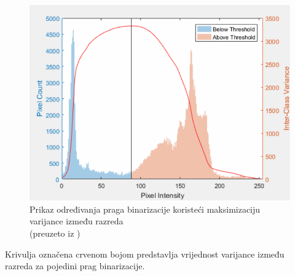 \documentclass[times, utf8, diplomski]{fer}
\theoremstyle{definition}
\begin{document}
\begin{figure}[h]
\centering
\includegraphics[scale=0.46]{otsu_method.png}
\caption{Prikaz određivanja praga binarizacije koristeći maksimizaciju varijance između razreda \\ (preuzeto iz \cite{ otsu:xxx})}
\end{figure}
Krivulja označena crvenom bojom predstavlja vrijednost varijance između razreda za pojedini prag binarizacije.
\end{document}
